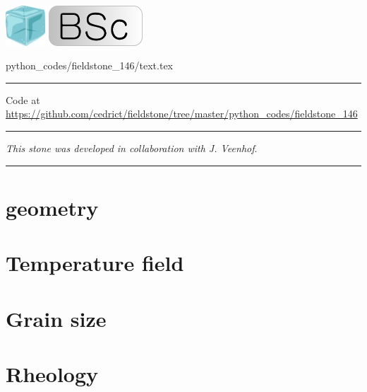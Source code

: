 
\includegraphics[height=1.5cm]{images/pictograms/ice}
\includegraphics[height=1.5cm]{images/pictograms/bsc}

\begin{flushright} {\tiny {\color{gray} python\_codes/fieldstone\_146/text.tex}} \end{flushright}



\par\noindent\rule{\textwidth}{0.4pt}

\begin{center}
Code at \url{https://github.com/cedrict/fieldstone/tree/master/python_codes/fieldstone_146}
\end{center}

\par\noindent\rule{\textwidth}{0.4pt}

{\sl This stone was developed in collaboration with J. Veenhof}. 

\par\noindent\rule{\textwidth}{0.4pt}



\section*{geometry}


\section*{Temperature field}


\section*{Grain size}


\section*{Rheology}






